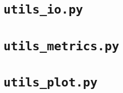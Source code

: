 \section{\texttt{utils\_io.py}}


\section{\texttt{utils\_metrics.py}}


\section{\texttt{utils\_plot.py}}

